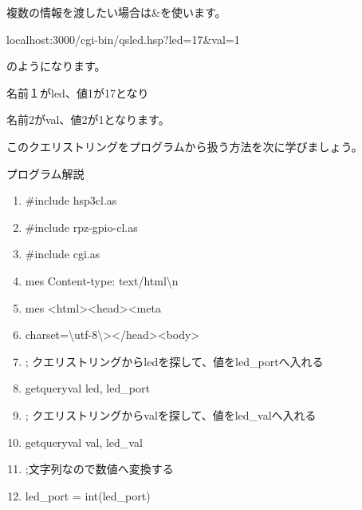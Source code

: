 \documentclass[a4paper,12pt,dvipdfmx]{jarticle}
\newcounter{Exercise}
\begin{document}
複数の情報を渡したい場合は\&を使います。

localhost:3000/cgi-bin/qsled.hsp?led=17\&val=1

のようになります。

名前１がled、値1が17となり

名前2がval、値2が1となります。

このクエリストリングをプログラムから扱う方法を次に学びましょう。

\clearpage
プログラム解説
\addtocounter{Exercise}{-1}\label{gpio}



\centering
\begin{boxedminipage}{16.538cm}
	\begin{enumerate}
	\baselineskip 10pt
	\setlength{\itemsep}{0cm}
	\item\#include {\textquotedbl}hsp3cl.as{\textquotedbl}

	\item\#include {\textquotedbl}rpz-gpio-cl.as{\textquotedbl}

	\item\#include {\textquotedbl}cgi.as{\textquotedbl}

	\item mes {\textquotedbl}Content-type: text/html{\textbackslash}n{\textquotedbl}

	\item mes {\textquotedbl}{\textless}html{\textgreater}{\textless}head{\textgreater}{\textless}meta
	\item charset={\textbackslash}{\textquotedbl}utf-8{\textbackslash}{\textquotedbl}{\textgreater}{\textless}/head{\textgreater}{\textless}body{\textgreater}{\textquotedbl}

	\item; クエリストリングからledを探して、値をled\_portへ入れる

	\item getqueryval {\textquotedbl}led{\textquotedbl}, led\_port

	\item ; クエリストリングからvalを探して、値をled\_valへ入れる

	\item getqueryval {\textquotedbl}val{\textquotedbl}, led\_val

	\item ;文字列なので数値へ変換する

	\item led\_port = int(led\_port)


\end{enumerate}
\end{boxedminipage}
\end{document}
